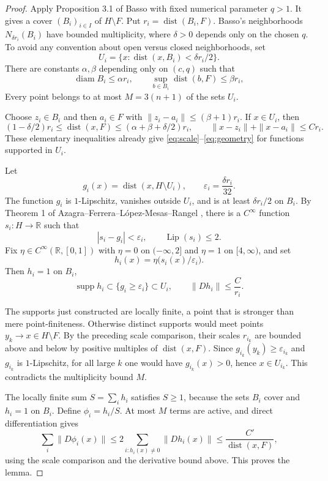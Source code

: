 \documentclass[11pt]{article}
\newcommand{\dist}{\operatorname{dist}}
\newcommand{\supp}{\operatorname{supp}}
\newcommand{\Lip}{\operatorname{Lip}}
\begin{document}
\begin{proof}
Apply Proposition 3.1 of Basso \cite{Basso} with fixed numerical parameter
$q>1$.  It gives a cover $(B_i)_{i\in I}$ of $H\setminus F$.  Put
$r_i=\dist(B_i,F)$.  Basso's neighborhoods
$N_{\delta r_i}(B_i)$ have bounded multiplicity, where $\delta>0$ depends
only on the chosen $q$.  To avoid any convention about open versus closed
neighborhoods, set
\[
 U_i=\{x:\dist(x,B_i)<\delta r_i/2\}.
\]
There are constants $\alpha,\beta$ depending only on $(c,q)$ such that
\[
 \operatorname{diam}B_i\le\alpha r_i,
 \qquad \sup_{b\in B_i}\dist(b,F)\le\beta r_i,
\]
Every point belongs to at most $M=3(n+1)$ of the sets $U_i$.

Choose $z_i\in B_i$ and then $a_i\in F$ with
$\|z_i-a_i\|\le(\beta+1)r_i$.  If $x\in U_i$, then
\[
 (1-\delta/2)r_i\le\dist(x,F)
 \le(\alpha+\beta+\delta/2)r_i,
 \qquad
 \|x-z_i\|+\|x-a_i\|\le C r_i.
\]
These elementary inequalities already give
\eqref{eq:scale}--\eqref{eq:geometry} for functions supported in $U_i$.

Let
\[
 g_i(x)=\dist(x,H\setminus U_i),
 \qquad \varepsilon_i=\frac{\delta r_i}{32}.
\]
The function $g_i$ is $1$-Lipschitz, vanishes outside $U_i$, and is at least
$\delta r_i/2$ on $B_i$.  By Theorem 1 of
Azagra--Ferrera--L\'opez-Mesas--Rangel \cite{AFLR}, there is a
$C^\infty$ function $s_i:H\to\mathbb R$ such that
\[
 |s_i-g_i|<\varepsilon_i,
 \qquad \Lip(s_i)\le2.
\]
Fix $\eta\in C^\infty(\mathbb R,[0,1])$ with
$\eta=0$ on $(-\infty,2]$ and $\eta=1$ on $[4,\infty)$, and set
\[
 h_i(x)=\eta\bigl(s_i(x)/\varepsilon_i\bigr).
\]
Then $h_i=1$ on $B_i$,
\[
 \supp h_i\subset\{g_i\ge\varepsilon_i\}\subset U_i,
 \qquad
 \|Dh_i\|\le \frac{C}{r_i}.
\]

The supports just constructed are locally finite, a point that is stronger than mere
point-finiteness.  Otherwise distinct supports would meet points
$y_k\to x\in H\setminus F$.  By the preceding scale comparison, their scales $r_{i_k}$ are bounded above
and below by positive multiples of $\dist(x,F)$.  Since
$g_{i_k}(y_k)\ge\varepsilon_{i_k}$ and $g_{i_k}$ is $1$-Lipschitz, for all
large $k$ one would have $g_{i_k}(x)>0$, hence $x\in U_{i_k}$.  This
contradicts the multiplicity bound $M$.

The locally finite sum $S=\sum_i h_i$ satisfies $S\ge1$, because the sets
$B_i$ cover and $h_i=1$ on $B_i$.  Define $\phi_i=h_i/S$.  At most $M$ terms
are active, and direct differentiation gives
\[
 \sum_i\|D\phi_i(x)\|
 \le2\sum_{i:h_i(x)\ne0}\|Dh_i(x)\|
 \le \frac{C'}{\dist(x,F)},
\]
using the scale comparison and the derivative bound above.  This proves the lemma.
\end{proof}
\end{document}
